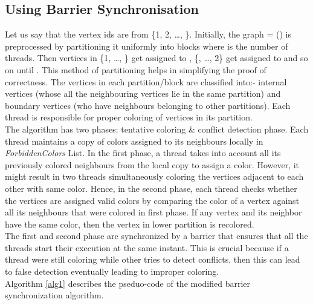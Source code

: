 \documentclass[a4paper,11pt]{article}
\begin{document}
\subsection{Using Barrier Synchronisation}
\indent Let us say that the vertex ids are from \{1, 2, \dots, \}. Initially, the graph  = () is preprocessed by partitioning it uniformly into  blocks where  is the number of threads. Then vertices in \{1, \dots, \} get assigned to , \{, \dots, 2\} get assigned to  and so on until . This method of partitioning helps in simplifying the proof of correctness. The vertices in each partition/block are classified into:- internal vertices (whose all the neighbouring vertices lie in the same partition) and boundary vertices (who have  neighbours belonging to other partitions). Each thread is responsible for proper coloring of vertices in its partition. \\
\indent The algorithm has two phases: tentative coloring \& conflict detection phase. Each thread maintains a copy of colors assigned to its neighbours locally in \textit{ForbiddenColors} List. In the first phase, a thread takes into account all its previously colored neighbours from the local copy to assign a color. However, it might result in two threads simultaneously coloring the vertices adjacent to each other with same color. Hence, in the second phase, each thread  checks whether the vertices  are assigned valid colors by comparing the color of a vertex against all its neighbours that were colored in first phase. If any vertex and its neighbor have the same color, then the vertex in lower partition is recolored.\\
\indent The first and second phase are synchronized by a barrier that ensures that all the  threads start their execution at the same instant. This is crucial because if a thread were still coloring while other tries to detect conflicts, then this can lead to false detection eventually leading to improper coloring.\\
\newline
Algorithm \ref{alg1} describes the pseduo-code of the modified barrier synchronization algorithm.\\
\end{document}
